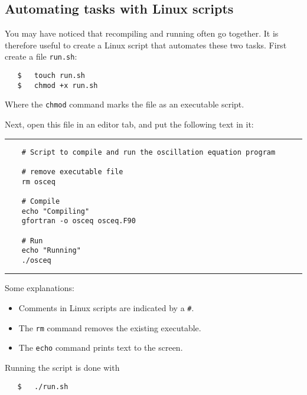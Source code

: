 \documentclass[a4paper]{article}
\begin{document}
\subsection{Automating tasks with Linux scripts}
%
\par
You may have noticed that recompiling and running often go together. It is therefore useful to create a Linux script that automates these two tasks. First create a file \texttt{run.sh}:
%
\begin{verbatim}
   $   touch run.sh
   $   chmod +x run.sh
\end{verbatim}
%
Where the \verb+chmod+ command marks the file as an executable script.
%
\par
Next, open this file in an editor tab, and put the following text in it:
%
{\vspace{10pt}\hrule\small\vspace*{-2pt}\begin{verbatim}
    # Script to compile and run the oscillation equation program
    
    # remove executable file
    rm osceq
    
    # Compile
    echo "Compiling"
    gfortran -o osceq osceq.F90
    
    # Run
    echo "Running"
    ./osceq
\end{verbatim}\hrule\vspace{5pt}}
%
%
Some explanations:
%
\begin{itemize}
	\item Comments in Linux scripts are indicated by a \verb+#+.
	\item The \verb+rm+ command removes the existing executable.
	\item The \verb+echo+ command prints text to the screen.
\end{itemize}
%
\par
Running the script is done with
%
\begin{verbatim}
   $   ./run.sh
\end{verbatim}
%
\end{document}
